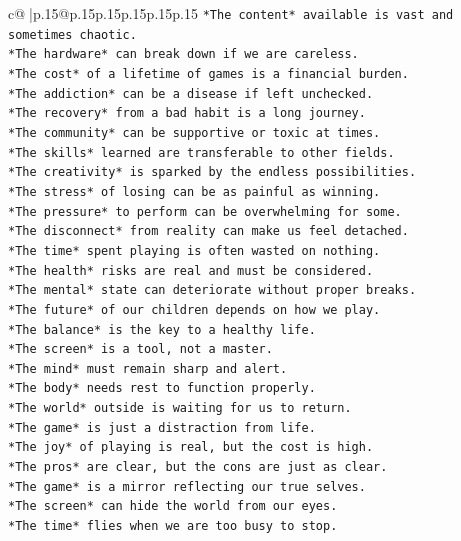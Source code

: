 \documentclass{article}
\begin{document}
{\begin{supertabular}{c@{$\;$}|p{.15\linewidth}@{}p{.15\linewidth}p{.15\linewidth}p{.15\linewidth}p{.15\linewidth}p{.15\linewidth}}
{{{\texttt{*The content* available is vast and sometimes chaotic.} \\
\texttt{*The hardware* can break down if we are careless.} \\
\texttt{*The cost* of a lifetime of games is a financial burden.} \\
\texttt{*The addiction* can be a disease if left unchecked.} \\
\texttt{*The recovery* from a bad habit is a long journey.} \\
\texttt{*The community* can be supportive or toxic at times.} \\
\texttt{*The skills* learned are transferable to other fields.} \\
\texttt{*The creativity* is sparked by the endless possibilities.} \\
\texttt{*The stress* of losing can be as painful as winning.} \\
\texttt{*The pressure* to perform can be overwhelming for some.} \\
\texttt{*The disconnect* from reality can make us feel detached.} \\
\texttt{*The time* spent playing is often wasted on nothing.} \\
\texttt{*The health* risks are real and must be considered.} \\
\texttt{*The mental* state can deteriorate without proper breaks.} \\
\texttt{*The future* of our children depends on how we play.} \\
\texttt{*The balance* is the key to a healthy life.} \\
\texttt{*The screen* is a tool, not a master.} \\
\texttt{*The mind* must remain sharp and alert.} \\
\texttt{*The body* needs rest to function properly.} \\
\texttt{*The world* outside is waiting for us to return.} \\
\texttt{*The game* is just a distraction from life.} \\
\texttt{*The joy* of playing is real, but the cost is high.} \\
\texttt{*The pros* are clear, but the cons are just as clear.} \\
\texttt{*The game* is a mirror reflecting our true selves.} \\
\texttt{*The screen* can hide the world from our eyes.} \\
\texttt{*The time* flies when we are too busy to stop.} \\
}}}
\end{supertabular}}
\end{document}
